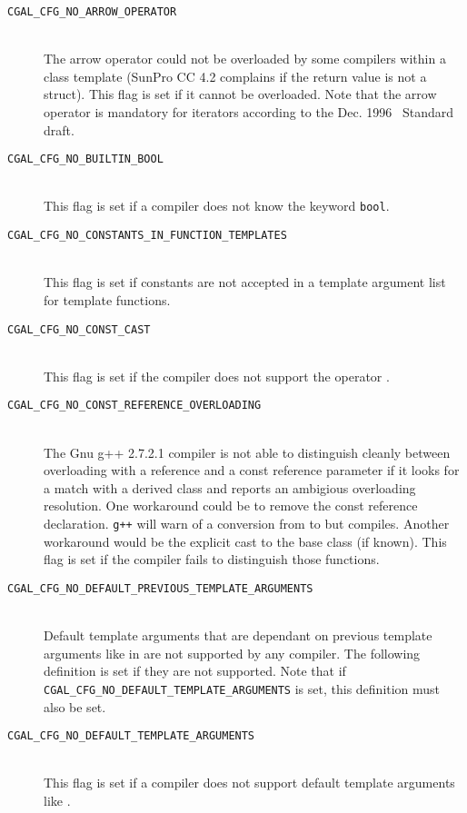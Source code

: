 \begin{description}
\item[{\tt CGAL\_CFG\_NO\_ARROW\_OPERATOR}]~\\
  The arrow operator  could not be overloaded by
  some compilers within a class template (SunPro CC 4.2 complains if
  the return value is not a struct). This flag is set
  if it cannot be overloaded. Note that the arrow operator is
  mandatory for iterators according to the Dec. 1996 \CC\ Standard
  draft.

\item[{\tt CGAL\_CFG\_NO\_BUILTIN\_BOOL}]~\\
  This flag is set if a compiler does not know the keyword {\tt bool}.

\item[{\tt CGAL\_CFG\_NO\_CONSTANTS\_IN\_FUNCTION\_TEMPLATES}]~\\
  This flag is set if constants are not accepted in a template
  argument list for template functions.

\item[{\tt CGAL\_CFG\_NO\_CONST\_CAST}]~\\
  This flag is set if the compiler does not support the operator
  .

\item[{\tt CGAL\_CFG\_NO\_CONST\_REFERENCE\_OVERLOADING}]~\\
  The Gnu g++ 2.7.2.1 compiler is not able to distinguish cleanly between
  overloading with a reference and a const reference parameter if it
  looks for a match with a derived class and reports an ambigious
  overloading resolution. One workaround could be to remove the const
  reference declaration. {\tt g++} will warn of a conversion from  to  but compiles. Another workaround would be the
  explicit cast to the base class (if known).  This flag 
  is set if the compiler fails to distinguish those functions.

\item[{\tt CGAL\_CFG\_NO\_DEFAULT\_PREVIOUS\_TEMPLATE\_ARGUMENTS}]~\\
  Default template arguments that are dependant on previous template
  arguments like in 
  are not supported by any compiler. The following definition is set
  if they are not supported. Note that if {\tt
    CGAL\_CFG\_NO\_DEFAULT\_TEMPLATE\_ARGUMENTS} is set, this
  definition must also be set.

\item[{\tt CGAL\_CFG\_NO\_DEFAULT\_TEMPLATE\_ARGUMENTS}]~\\
  This flag is set if a compiler does not support default template
  arguments like .
 

\end{description}
